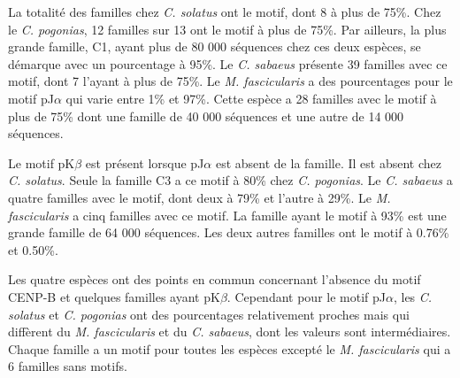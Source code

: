 \documentclass[12pt,a4paper]{article}
\begin{document}
		La totalité des familles chez \textit{C. solatus} ont le motif, dont 8 à plus de 75\%. Chez le \textit{C. pogonias}, 12 familles sur 13 ont le motif à plus de 75\%. Par ailleurs, la plus grande famille, C1, ayant plus de 80 000 séquences chez ces deux espèces, se démarque avec un pourcentage à 95\%. Le \textit{C. sabaeus} présente 39 familles avec ce motif, dont 7 l'ayant à plus de 75\%. Le \textit{M. fascicularis} a des pourcentages pour le motif pJ$\alpha$ qui varie entre 1\% et 97\%. Cette espèce a 28 familles avec le motif à plus de 75\% dont une famille de  40 000 séquences et une autre de 14 000 séquences.
		
			Le motif pK$\beta$ est présent lorsque pJ$\alpha$ est absent de la famille. Il est absent chez \textit{C. solatus}. Seule la famille C3 a ce motif à 80\% chez \textit{C. pogonias}. Le \textit{C. sabaeus} a quatre familles avec le motif, dont deux à 79\% et l'autre à 29\%. Le \textit{M. fascicularis} a cinq familles avec ce motif. La famille ayant le motif à 93\% est une grande famille de 64 000 séquences. Les deux autres familles ont le motif à 0.76\% et 0.50\%.
			
			Les quatre espèces ont des points en commun concernant l'absence du motif CENP-B et quelques familles ayant pK$\beta$. Cependant pour le motif pJ$\alpha$, les \textit{C. solatus} et \textit{C. pogonias} ont des pourcentages relativement proches mais qui diffèrent du \textit{M. fascicularis} et du \textit{C. sabaeus}, dont les valeurs sont intermédiaires. Chaque famille a un motif pour toutes les espèces excepté le \textit{M. fascicularis} qui a 6 familles sans motifs.
				
\end{document}
